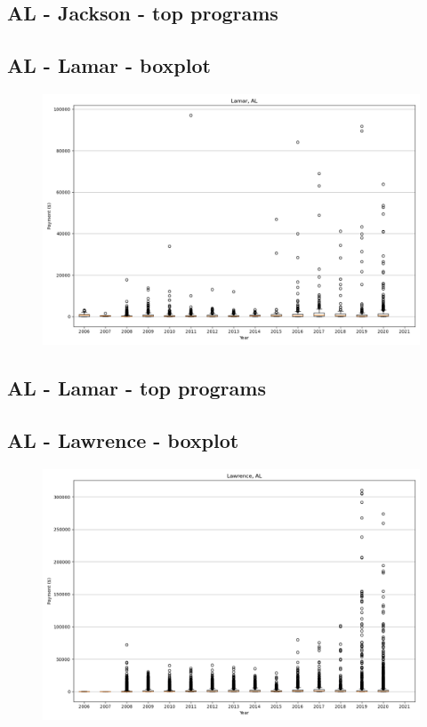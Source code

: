 \subsection*{AL - Jackson - top programs}

\newpage
\subsection*{AL - Lamar - boxplot}
\begin{figure}[h]
\centering
\includegraphics[width=7in]{../output/boxplots/counties/Lamar-AL_boxplot.png}
\end{figure}


\subsection*{AL - Lamar - top programs}

\newpage
\subsection*{AL - Lawrence - boxplot}
\begin{figure}[h]
\centering
\includegraphics[width=7in]{../output/boxplots/counties/Lawrence-AL_boxplot.png}
\end{figure}


